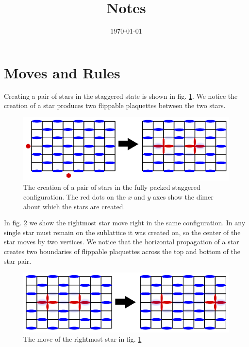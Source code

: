 \documentclass[aps,floatfix,11pt]{revtex4-1}
\begin{document}
\title{Notes}

\date{\today}

\begin{abstract}
    
\end{abstract}

\maketitle 

\section{Moves and Rules}

Creating a pair of stars in the staggered state is shown in fig. \ref{fig:create_pair}. We notice
the creation of a star produces two flippable plaquettes between the two stars.

\begin{figure}[h]
    \centering
    \includegraphics[width=8.5 cm]{create_pair}
    \caption{The creation of a pair of stars in the fully packed staggered configuration. The red
    dots on the $x$ and $y$ axes show the dimer about which the stars are created.
\label{fig:create_pair}}
\end{figure}

\noindent In fig. \ref{fig:move_right} we show the rightmost star move right in the same
configuration. In any single star must remain on the sublattice it was created on, so the center of
the star moves by two vertices. We notice that the horizontal propagation of a star creates two boundaries of
flippable plaquettes across the top and bottom of the star pair. 

\begin{figure}[h]
    \centering
    \includegraphics[width=8.5 cm]{move_right}
    \caption{The move of the rightmost star in fig. \ref{fig:create_pair} \label{fig:move_right}}
\end{figure}
\end{document}
